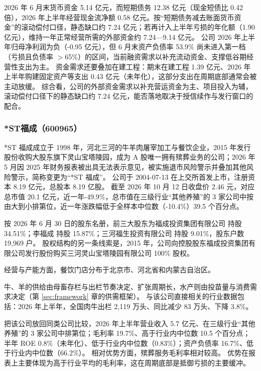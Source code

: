  2026 年 6 月末货币资金 5.14 亿元，而短期债务 12.38 亿元（现金短债比 0.42 倍），2026 年上半年经营现金流净额 0.58 亿元。按“短期债务减去账面货币资金”的滚动偿付口径，静态缺口约 7.24 亿元；若再计入上半年亏损的年化额（1.90 亿元），维持一年正常经营所需的外部资金约 7.24---9.14 亿元。 公司 2026 年上半年归母净利润为负（-0.95 亿元），但 6 月末资产负债率 53.9\% 尚未进入第一档（亏损且负债率 $>$65\%）的区间，当前融资需求以补充流动资金、支撑低谷期经营性支出为主。 资金需求还要叠加在建工程：期末在建工程 1.39 亿元、2026 年上半年购建固定资产等支出 0.43 亿元（未年化），这部分支出在周期底部通常会被主动放缓。 综合看，公司的外部资金需求以补充营运资金为主、项目投入为辅，滚动偿付口径下的静态缺口约 7.24 亿元，能否落地取决于授信续作与发行窗口的配合。




\subsubsection{*ST福成（600965）}
\label{co:600965}

 *ST 福成成立于 1998 年，河北三河的牛羊肉屠宰加工与餐饮企业，2015 年发行股份收购大股东旗下灵山宝塔陵园，成为 A 股唯一拥有殡葬业务的公司；2026 年 5 月因 2025 年财务报表被出具无法表示意见，被实施退市风险警示并叠加其他风险警示，简称变更为“*ST 福成”。 公司于 2004-07-13 在上交所首发上市，注册资本 8.19 亿元，总股本 8.19 亿股。 截至 2026 年 10 月 12 日收盘价 2.46 元，对应总市值 20.1 亿元，近一年-49.9\%，总市值在三级行业“其他养殖”的 3 家公司中按由大到小排第位，近一年涨跌幅低于全样本中位数（-10.4\%）39.5 个百分点。

 按 2026 年 6 月 30 日的股东名册，前三大股东为福成投资集团有限公司 持股 34.51\%；李福成 持股 15.87\%；三河福生投资有限公司 持股 9.01\%，股东户数 19,969 户。 股权结构的另一条线索是，2015 年，公司向控股股东福成投资集团有限公司发行股份购买三河灵山宝塔陵园有限公司 100\% 股权。

 经营与产能方面，餐饮门店分布于北京市、河北省和内蒙古自治区。

 牛、羊的供给由母畜存栏与出栏节奏决定、扩张周期长，水产则由投苗量与消费需求决定（第 \ref{sec:framework} 章的供需框架）。 与该公司直接相关的行业数据包括：2026 年上半年，全国肉牛出栏 2,119 万头、同比减少 83 万头、下降 3.8\%。

 把该公司放回同类公司比较，2026 年上半年营业收入 5.7 亿元、在三级行业“其他养殖”的 3 家公司中排第位；毛利率 19.7\%、高于行业内中位数 10.5 个百分点；半年 ROE 0.8\%（未年化）、低于行业内中位数（0.83\%）；资产负债率 16.7\%、低于行业内中位数（66.2\%）。 相对优势方面，殡葬服务毛利率相对较高。 优势在报表上主要体现为高于行业平均的毛利率，这在周期底部是抵御亏损的主要缓冲。

